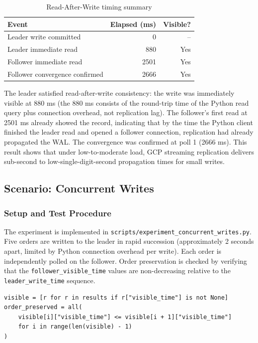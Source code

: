 \documentclass[12pt,a4paper]{article}
\begin{document}
\begin{table}[H]
\centering
\caption{Read-After-Write timing summary}
\begin{tabular}{lrr}
\toprule
\textbf{Event} & \textbf{Elapsed (ms)} & \textbf{Visible?} \\
\midrule
Leader write committed & 0 & -- \\
Leader immediate read & 880 & Yes \\
Follower immediate read & 2501 & Yes \\
Follower convergence confirmed & 2666 & Yes \\
\bottomrule
\end{tabular}
\end{table}

The leader satisfied read-after-write consistency: the write was immediately
visible at 880 ms (the 880 ms consists of the round-trip time of the Python read
query plus connection overhead, not replication lag). The follower's first read
at 2501 ms already showed the record, indicating that by the time the Python
client finished the leader read and opened a follower connection, replication had
already propagated the WAL. The convergence was confirmed at poll 1 (2666 ms).
This result shows that under low-to-moderate load, GCP streaming replication
delivers sub-second to low-single-digit-second propagation times for small writes.

\subsection{Scenario: Concurrent Writes}

\subsubsection{Setup and Test Procedure}

The experiment is implemented in \texttt{scripts/experiment\_concurrent\_writes.py}.
Five orders are written to the leader in rapid succession (approximately 2 seconds
apart, limited by Python connection overhead per write). Each order is independently
polled on the follower. Order preservation is checked by verifying that the
\texttt{follower\_visible\_time} values are non-decreasing relative to the
\texttt{leader\_write\_time} sequence.

\begin{lstlisting}[style=pythonstyle, caption={Order preservation check -- Concurrent Writes}]
visible = [r for r in results if r["visible_time"] is not None]
order_preserved = all(
    visible[i]["visible_time"] <= visible[i + 1]["visible_time"]
    for i in range(len(visible) - 1)
)
\end{lstlisting}
\end{document}
